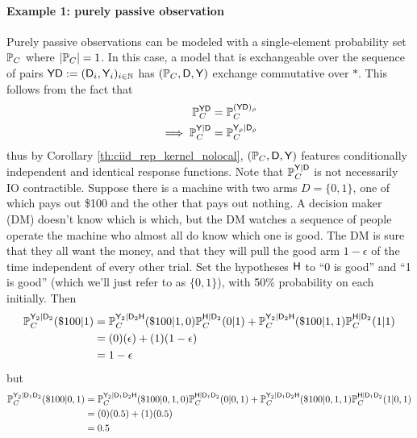 \paragraph{Example 1: purely passive observation}\label{pgph:passive_strategic}

Purely passive observations can be modeled with a single-element probability set $\mathbb{P}_C$ where $|\mathbb{P}_C|=1$. In this case, a model that is exchangeable over the sequence of pairs $\mathsf{YD}:=(\mathsf{D}_i,\mathsf{Y}_i)_{i\in \mathbb{N}}$ has $(\mathbb{P}_C, \mathsf{D},\mathsf{Y})$ exchange commutative over $*$. This follows from the fact that
\begin{align}{}
    \mathbb{P}_C^{\mathsf{YD}} &= \mathbb{P}_C^{(\mathsf{Y}\mathsf{D})_\rho}\\
    \implies \mathbb{P}_C^{\mathsf{Y}|\mathsf{D}} &= \mathbb{P}_C^{\mathsf{Y}_\rho|\mathsf{D}_\rho}
\end{align}
thus by Corollary \ref{th:ciid_rep_kernel_nolocal}, $(\mathbb{P}_C, \mathsf{D},\mathsf{Y})$ features conditionally independent and identical response functions. Note that $\mathbb{P}_C^{\mathsf{Y}|\mathsf{D}}$ is not necessarily IO contractible. Suppose there is a machine with two arms $D=\{0,1\}$, one of which pays out \$100 and the other that pays out nothing. A decision maker (DM) doesn't know which is which, but the DM watches a sequence of people operate the machine who almost all do know which one is good. The DM is sure that they all want the money, and that they will pull the good arm $1-\epsilon$ of the time independent of every other trial. Set the hypotheses $\mathsf{H}$ to ``0 is good'' and ``1 is good'' (which we'll just refer to as $\{0,1\}$), with 50\% probability on each initially. Then
\begin{align}
    \mathbb{P}_C^{\mathsf{Y}_2|\mathsf{D}_2}(\$100|1) &= \mathbb{P}_C^{\mathsf{Y}_2|\mathsf{D}_2\mathsf{H}}(\$100|1,0)\mathbb{P}_C^{\mathsf{H}|\mathsf{D}_2}(0|1) + \mathbb{P}_C^{\mathsf{Y}_2|\mathsf{D}_2\mathsf{H}}(\$100|1,1)\mathbb{P}_C^{\mathsf{H}|\mathsf{D}_2}(1|1)\\
    &= (0)(\epsilon) + (1)(1-\epsilon)\\
    &= 1-\epsilon
\end{align}
but
\begin{align}
    \mathbb{P}_C^{\mathsf{Y}_2|\mathsf{D}_1\mathsf{D}_2}(\$100|0,1) &= \mathbb{P}_C^{\mathsf{Y}_2|\mathsf{D}_1\mathsf{D}_2\mathsf{H}}(\$100|0,1,0)\mathbb{P}_C^{\mathsf{H}|\mathsf{D}_1\mathsf{D}_2}(0|0,1) + \mathbb{P}_C^{\mathsf{Y}_2|\mathsf{D}_1\mathsf{D}_2\mathsf{H}}(\$100|0,1,1)\mathbb{P}_C^{\mathsf{H}|\mathsf{D}_1\mathsf{D}_2}(1|0,1)\\
    &= (0)(0.5) + (1)(0.5)\\
    &= 0.5
\end{align}

